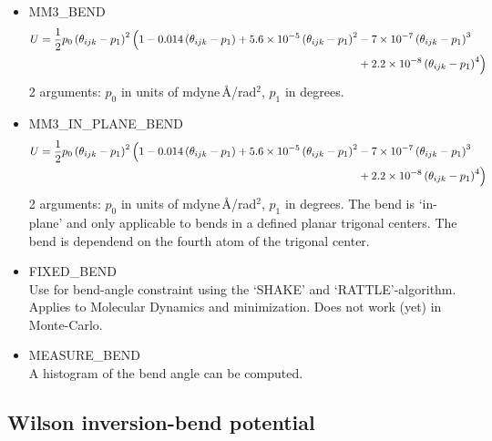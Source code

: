 \begin{itemize}
  \item{MM3\_BEND}
  \begin{equation}
  \begin{split}
  U=\frac{1}{2}p_0 \left(\theta_{ijk}-p_1\right)^2\Bigl(1-0.014\left(\theta_{ijk}-p_1\right)+
   5.6\times10^{-5}\left(\theta_{ijk}-p_1\right)^2&-7\times10^{-7}\left(\theta_{ijk}-p_1\right)^3\\
   &+2.2\times10^{-8}\left(\theta_{ijk}-p_1\right)^4
   \Bigr)
  \end{split}
  \end{equation}
  2 arguments: $p_0$ in units of mdyne\,\AA/rad$^2$, $p_1$ in degrees.
  \item{MM3\_IN\_PLANE\_BEND}
  \begin{equation}
  \begin{split}
  U=\frac{1}{2}p_0 \left(\theta_{ijk}-p_1\right)^2\Bigl(1-0.014\left(\theta_{ijk}-p_1\right)+
   5.6\times10^{-5}\left(\theta_{ijk}-p_1\right)^2&-7\times10^{-7}\left(\theta_{ijk}-p_1\right)^3\\
   &+2.2\times10^{-8}\left(\theta_{ijk}-p_1\right)^4
   \Bigr)
  \end{split}
  \end{equation}
  2 arguments: $p_0$ in units of mdyne\,\AA/rad$^2$, $p_1$ in degrees. The bend is `in-plane' and only applicable to bends in a defined planar trigonal centers.
  The bend is dependend on the fourth atom of the trigonal center.

  \item{FIXED\_BEND}\\
   Use for bend-angle constraint using the `SHAKE' and `RATTLE'-algorithm. Applies to Molecular Dynamics and minimization.
   Does not work (yet) in Monte-Carlo.

  \item{MEASURE\_BEND}\\
  A histogram of the bend angle can be computed.

\end{itemize}

\subsection{Wilson inversion-bend potential}

